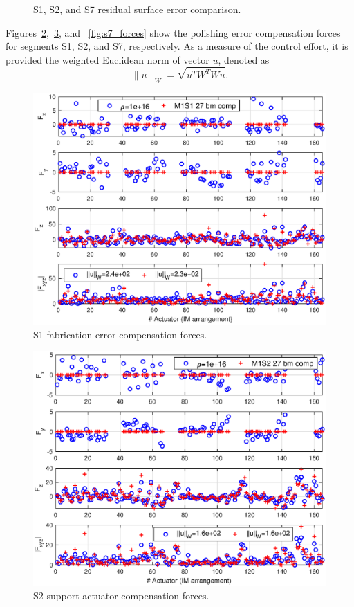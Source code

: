 \documentclass{gmto}
\begin{document}
\begin{figure}[p]
\begin{subfigure}[b]{\textwidth}
\end{subfigure}
\caption{\textsf{S1}, \textsf{S2}, and \textsf{S7} residual surface error comparison.}
\label{fig:S1S2S7s_rmse}
\end{figure}


Figures~\ref{fig:s1_forces},~\ref{fig:s2_forces}, and ~\ref{fig:s7_forces} show the polishing error compensation forces for segments \textsf{S1}, \textsf{S2}, and \textsf{S7}, respectively. As a measure of the control effort, it is provided the weighted Euclidean norm of vector $u$, denoted as \[
\|u\|_W = \sqrt{u^T W^T W u} .
\]
%
\begin{figure}[!htb]
\centering
\includegraphics[width=\textwidth]{./pictures/s1_comp_Forces.eps}
\caption{\textsf{S1} fabrication error compensation forces.}
\label{fig:s1_forces}
\end{figure}
\begin{figure}[!htb]
\centering
\includegraphics[width=\textwidth]{./pictures/s2_comp_Forces.eps}
\caption{\textsf{S2} support actuator compensation forces.}
\label{fig:s2_forces}
\end{figure}
\end{document}
